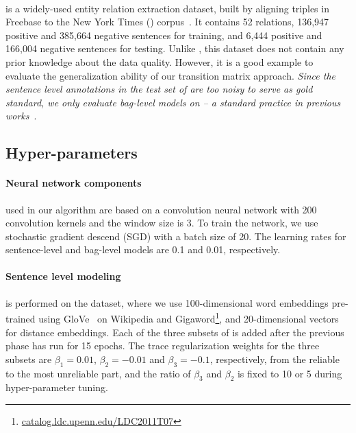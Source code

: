 \paragraph{\EntityRE} is a widely-used entity
relation extraction dataset, built %
by aligning triples
in Freebase to the New York Times (\NYT) corpus~\cite{riedel2010modeling}. It contains 52 relations, 136,947 positive and 385,664 negative sentences for training, and 6,444 positive and 166,004 negative sentences  for testing.
Unlike \TimeRE, this dataset does not contain any prior knowledge about the data quality.
However, it is a good example to evaluate the generalization ability of our transition matrix approach.
\emph{Since the sentence level annotations in the test set of \EntityRE are too noisy to serve as gold standard,  we only evaluate bag-level models on \EntityRE -- a standard practice in previous works}~\cite{surdeanu2012multi,zeng2015distant,lin2016neural}. 



\subsection{Hyper-parameters}

\paragraph{Neural network components} used in our algorithm are based on a convolution neural network with 200 convolution kernels and the window size is 3. To train the network, we use stochastic gradient descend (SGD) with a batch size of 20.  The learning rates for sentence-level  and bag-level models are 0.1 and 0.01, respectively.

\paragraph{Sentence level modeling}
 is performed on the \TimeRE dataset, where we use 100-dimensional word embeddings pre-trained using GloVe~\cite{pennington2014glove} on Wikipedia and Gigaword\footnote{\url{catalog.ldc.upenn.edu/LDC2011T07}}, and 20-dimensional vectors for distance embeddings. Each of the three subsets of \TimeRE is added after the previous phase has run for 15 epochs. The trace regularization weights for the three subsets are $\beta_1=0.01$, $\beta_2=-0.01$ and $\beta_3=-0.1$, respectively, from the reliable to the most unreliable part, and the ratio of $\beta_3$ and $\beta_2$ is fixed to 10 or 5 during hyper-parameter tuning.

